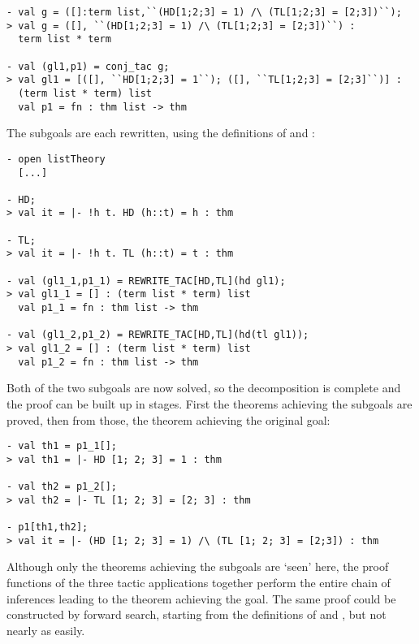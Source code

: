 \setcounter{sessioncount}{1}
\begin{session}
\begin{verbatim}
- val g = ([]:term list,``(HD[1;2;3] = 1) /\ (TL[1;2;3] = [2;3])``);
> val g = ([], ``(HD[1;2;3] = 1) /\ (TL[1;2;3] = [2;3])``) :
  term list * term

- val (gl1,p1) = conj_tac g;
> val gl1 = [([], ``HD[1;2;3] = 1``); ([], ``TL[1;2;3] = [2;3]``)] :
  (term list * term) list
  val p1 = fn : thm list -> thm
\end{verbatim}
\end{session}

\noindent The subgoals are each rewritten, using the definitions of
 and :

\begin{session}
\begin{verbatim}
- open listTheory
  [...]

- HD;
> val it = |- !h t. HD (h::t) = h : thm

- TL;
> val it = |- !h t. TL (h::t) = t : thm

- val (gl1_1,p1_1) = REWRITE_TAC[HD,TL](hd gl1);
> val gl1_1 = [] : (term list * term) list
  val p1_1 = fn : thm list -> thm

- val (gl1_2,p1_2) = REWRITE_TAC[HD,TL](hd(tl gl1));
> val gl1_2 = [] : (term list * term) list
  val p1_2 = fn : thm list -> thm
\end{verbatim}
\end{session}

\noindent Both of the two subgoals are now solved, so the
decomposition is complete and the proof can be built up in stages.
First the theorems achieving the subgoals are proved, then from those,
the theorem achieving the original goal:
\vfill
\newpage
\begin{session}
\begin{verbatim}
- val th1 = p1_1[];
> val th1 = |- HD [1; 2; 3] = 1 : thm

- val th2 = p1_2[];
> val th2 = |- TL [1; 2; 3] = [2; 3] : thm

- p1[th1,th2];
> val it = |- (HD [1; 2; 3] = 1) /\ (TL [1; 2; 3] = [2;3]) : thm
\end{verbatim}
\end{session}

\noindent Although only the theorems achieving the subgoals are `seen' here,
the proof functions of the three tactic applications together perform
the entire chain
 of inferences leading to the theorem achieving the goal.
The same proof could be constructed by forward search, starting from
the definitions of  and , but not nearly as easily.

